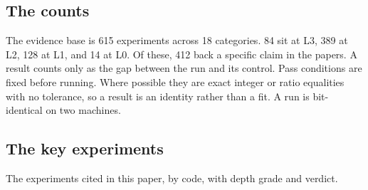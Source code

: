 \subsection*{The counts}

The evidence base is 615 experiments across 18 categories. 84 sit at L3, 389 at L2, 128 at L1, and 14 at L0. Of these, 412
back a specific claim in the papers. A result counts only as the gap between the run and its control. Pass conditions are
fixed before running. Where possible they are exact integer or ratio equalities with no tolerance, so a result is an
identity rather than a fit. A run is bit-identical on two machines.

\subsection*{The key experiments}

The experiments cited in this paper, by code, with depth grade and verdict.

